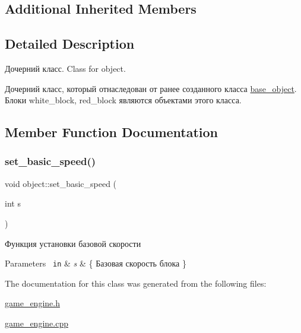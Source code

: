 \subsection*{Additional Inherited Members}


\subsection{Detailed Description}
Дочерний класс. Class for object. 

Дочерний класс, который отнаследован от ранее созданного класса \mbox{\hyperlink{classbase__object}{base\+\_\+object}}. Блоки white\+\_\+block, red\+\_\+block являются объектами этого класса. 

\subsection{Member Function Documentation}
\mbox{\label{classobject_a8a93112d56c32430e1eb5560d2db6912}} 
\subsubsection{\texorpdfstring{set\_basic\_speed()}{set\_basic\_speed()}}
{\footnotesize\ttfamily void object\+::set\+\_\+basic\+\_\+speed (\begin{DoxyParamCaption}\item[{int}]{s }\end{DoxyParamCaption})}



Функция установки базовой скорости 


\begin{DoxyParams}[1]{Parameters}
\mbox{\texttt{ in}}  & {\em s} & \{ Базовая скорость блока \} \\
\hline
\end{DoxyParams}


The documentation for this class was generated from the following files\+:\begin{DoxyCompactItemize}
\item 
\mbox{\hyperlink{game__engine_8h}{game\+\_\+engine.\+h}}\item 
\mbox{\hyperlink{game__engine_8cpp}{game\+\_\+engine.\+cpp}}\end{DoxyCompactItemize}
